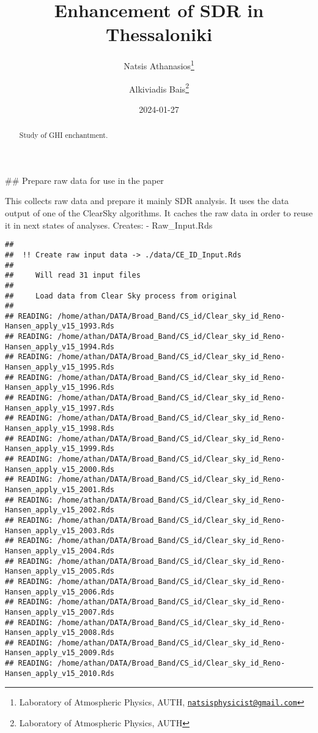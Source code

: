 \documentclass[
  10pt,
  a4paper,oneside]{article}
\title{Enhancement of SDR in Thessaloniki}
\author{Natsis Athanasios\footnote{Laboratory of Atmospheric Physics, AUTH, \href{mailto:natsisphysicist@gmail.com}{\nolinkurl{natsisphysicist@gmail.com}}} \and Alkiviadis Bais\footnote{Laboratory of Atmospheric Physics, AUTH}}
\date{2024-01-27}
\begin{document}
\maketitle
\begin{abstract}
Study of GHI enchantment.
\end{abstract}

{
\hypersetup{linkcolor=}
\setcounter{tocdepth}{4}
\tableofcontents
}
\#\# Prepare raw data for use in the paper

This collects raw data and prepare it mainly SDR analysis.
It uses the data output of one of the ClearSky algorithms.
It caches the raw data in order to reuse it in next states of analyses.
Creates:
- Raw\_Input.Rds

\begin{verbatim}
## 
##  !! Create raw input data -> ./data/CE_ID_Input.Rds 
## 
##     Will read 31 input files
## 
##     Load data from Clear Sky process from original
## 
## READING: /home/athan/DATA/Broad_Band/CS_id/Clear_sky_id_Reno-Hansen_apply_v15_1993.Rds 
## READING: /home/athan/DATA/Broad_Band/CS_id/Clear_sky_id_Reno-Hansen_apply_v15_1994.Rds 
## READING: /home/athan/DATA/Broad_Band/CS_id/Clear_sky_id_Reno-Hansen_apply_v15_1995.Rds 
## READING: /home/athan/DATA/Broad_Band/CS_id/Clear_sky_id_Reno-Hansen_apply_v15_1996.Rds 
## READING: /home/athan/DATA/Broad_Band/CS_id/Clear_sky_id_Reno-Hansen_apply_v15_1997.Rds 
## READING: /home/athan/DATA/Broad_Band/CS_id/Clear_sky_id_Reno-Hansen_apply_v15_1998.Rds 
## READING: /home/athan/DATA/Broad_Band/CS_id/Clear_sky_id_Reno-Hansen_apply_v15_1999.Rds 
## READING: /home/athan/DATA/Broad_Band/CS_id/Clear_sky_id_Reno-Hansen_apply_v15_2000.Rds 
## READING: /home/athan/DATA/Broad_Band/CS_id/Clear_sky_id_Reno-Hansen_apply_v15_2001.Rds 
## READING: /home/athan/DATA/Broad_Band/CS_id/Clear_sky_id_Reno-Hansen_apply_v15_2002.Rds 
## READING: /home/athan/DATA/Broad_Band/CS_id/Clear_sky_id_Reno-Hansen_apply_v15_2003.Rds 
## READING: /home/athan/DATA/Broad_Band/CS_id/Clear_sky_id_Reno-Hansen_apply_v15_2004.Rds 
## READING: /home/athan/DATA/Broad_Band/CS_id/Clear_sky_id_Reno-Hansen_apply_v15_2005.Rds 
## READING: /home/athan/DATA/Broad_Band/CS_id/Clear_sky_id_Reno-Hansen_apply_v15_2006.Rds 
## READING: /home/athan/DATA/Broad_Band/CS_id/Clear_sky_id_Reno-Hansen_apply_v15_2007.Rds 
## READING: /home/athan/DATA/Broad_Band/CS_id/Clear_sky_id_Reno-Hansen_apply_v15_2008.Rds 
## READING: /home/athan/DATA/Broad_Band/CS_id/Clear_sky_id_Reno-Hansen_apply_v15_2009.Rds 
## READING: /home/athan/DATA/Broad_Band/CS_id/Clear_sky_id_Reno-Hansen_apply_v15_2010.Rds 

\end{verbatim}
\end{document}
